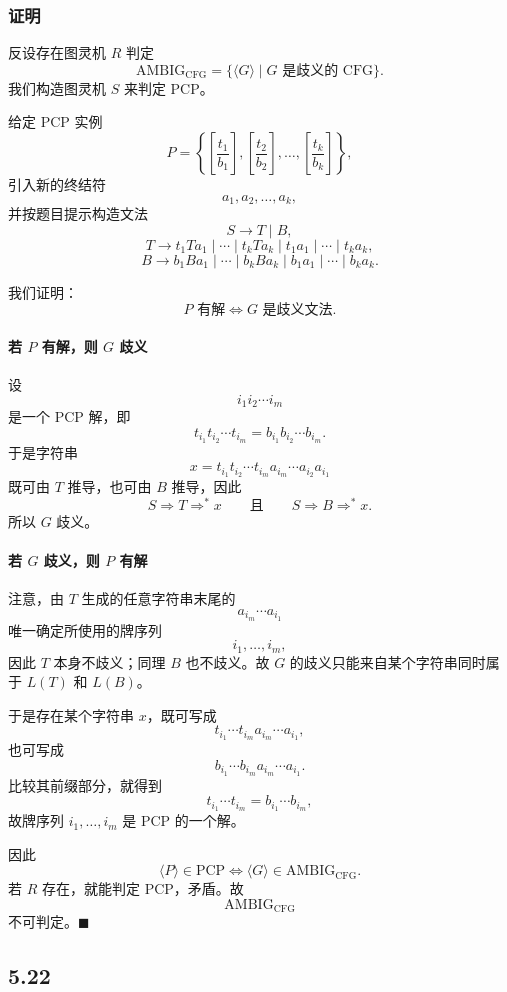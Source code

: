 \begin{answerred}
\subsubsection*{证明}

反设存在图灵机 $R$ 判定
\[
\mathrm{AMBIG}_{\mathrm{CFG}}
=
\{\langle G\rangle\mid G\text{ 是歧义的 CFG}\}.
\]
我们构造图灵机 $S$ 来判定 PCP。

给定 PCP 实例
\[
P=\left\{
\left[\frac{t_1}{b_1}\right],
\left[\frac{t_2}{b_2}\right],
\dots,
\left[\frac{t_k}{b_k}\right]
\right\},
\]
引入新的终结符
\[
a_1,a_2,\dots,a_k,
\]
并按题目提示构造文法
\[
S\to T\mid B,
\]
\[
T\to t_1Ta_1\mid\cdots\mid t_kTa_k\mid t_1a_1\mid\cdots\mid t_ka_k,
\]
\[
B\to b_1Ba_1\mid\cdots\mid b_kBa_k\mid b_1a_1\mid\cdots\mid b_ka_k.
\]

我们证明：
\[
P\text{ 有解}
\iff
G\text{ 是歧义文法}.
\]

\paragraph{若 $P$ 有解，则 $G$ 歧义}
设
\[
i_1i_2\cdots i_m
\]
是一个 PCP 解，即
\[
t_{i_1}t_{i_2}\cdots t_{i_m}
=
b_{i_1}b_{i_2}\cdots b_{i_m}.
\]
于是字符串
\[
x=t_{i_1}t_{i_2}\cdots t_{i_m}a_{i_m}\cdots a_{i_2}a_{i_1}
\]
既可由 $T$ 推导，也可由 $B$ 推导，因此
\[
S\Rightarrow T\Rightarrow^* x
\qquad\text{且}\qquad
S\Rightarrow B\Rightarrow^* x.
\]
所以 $G$ 歧义。

\paragraph{若 $G$ 歧义，则 $P$ 有解}
注意，由 $T$ 生成的任意字符串末尾的
\[
a_{i_m}\cdots a_{i_1}
\]
唯一确定所使用的牌序列
\[
i_1,\dots,i_m,
\]
因此 $T$ 本身不歧义；同理 $B$ 也不歧义。故 $G$ 的歧义只能来自某个字符串同时属于 $L(T)$ 和 $L(B)$。

于是存在某个字符串 $x$，既可写成
\[
t_{i_1}\cdots t_{i_m}a_{i_m}\cdots a_{i_1},
\]
也可写成
\[
b_{i_1}\cdots b_{i_m}a_{i_m}\cdots a_{i_1}.
\]
比较其前缀部分，就得到
\[
t_{i_1}\cdots t_{i_m}
=
b_{i_1}\cdots b_{i_m},
\]
故牌序列 $i_1,\dots,i_m$ 是 PCP 的一个解。

因此
\[
\langle P\rangle\in \mathrm{PCP}
\iff
\langle G\rangle\in \mathrm{AMBIG}_{\mathrm{CFG}}.
\]
若 $R$ 存在，就能判定 PCP，矛盾。故
\[
\mathrm{AMBIG}_{\mathrm{CFG}}
\]
不可判定。$\blacksquare$

\end{answerred}
\subsection*{5.22}


